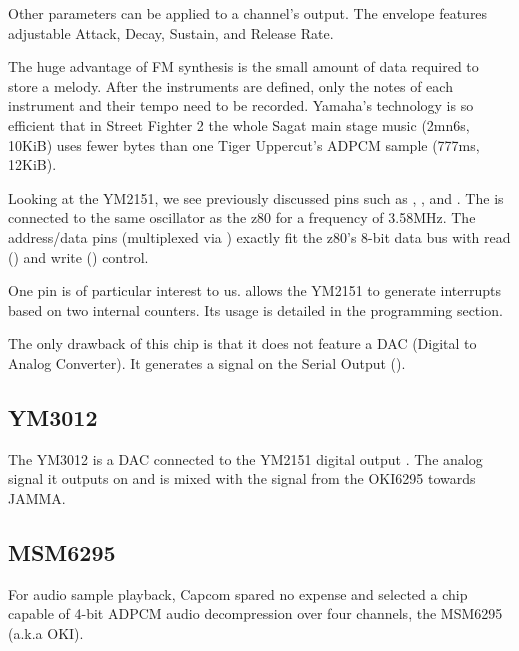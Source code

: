 Other parameters can be applied to a channel's output. The envelope features adjustable Attack, Decay, Sustain, and Release Rate. 


The huge advantage of FM synthesis is the small amount of data required to store a melody. After the instruments are defined, only the notes of each instrument and their tempo need to be recorded. Yamaha's technology is so efficient that in Street Fighter 2 the whole Sagat main stage music (2mn6s, 10KiB) uses fewer bytes than one Tiger Uppercut's ADPCM sample (777ms, 12KiB).




Looking at the YM2151, we see previously discussed pins such as , , and . The  is connected to the same oscillator as the z80 for a frequency of 3.58MHz. The  address/data pins (multiplexed via ) exactly fit the z80's 8-bit data bus with read () and write () control.


One pin is of particular interest to us.  allows the YM2151 to generate interrupts based on two internal counters. Its usage is detailed in the programming section.


The only drawback of this chip is that it does not feature a DAC (Digital to Analog Converter). It generates a signal on the Serial Output (). 

\subsection{YM3012}

The YM3012 is a DAC connected to the YM2151 digital output . The analog signal it outputs on  and  is mixed with the signal from the OKI6295 towards JAMMA.



\subsection{MSM6295}

For audio sample playback, Capcom spared no expense and selected a chip capable of 4-bit ADPCM audio decompression over four channels, the MSM6295 (a.k.a OKI). 

